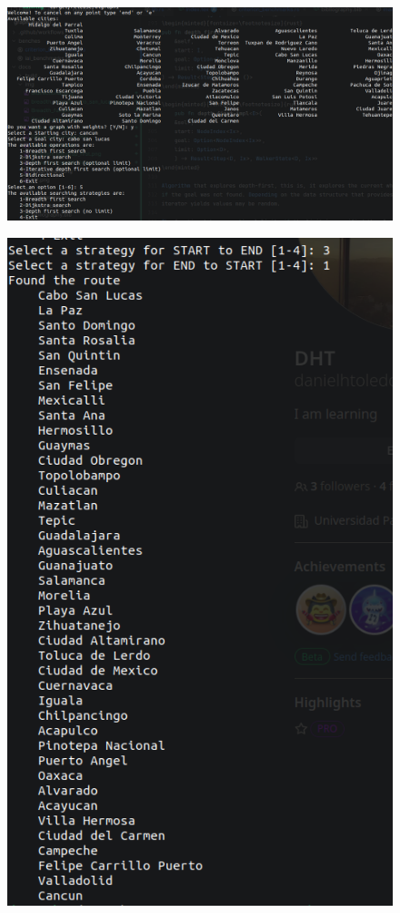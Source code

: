 \begin{figure}[H]
    \centering
    \includegraphics[scale=0.4]{../img/corrida1}
\end{figure}
\begin{figure}[H]
    \centering
    \includegraphics[scale=0.4]{../img/corrida2}
\end{figure}


